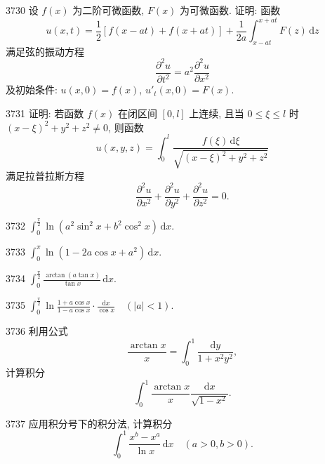 \begin{prob}[M]{3730}
设 $f(x)$ 为二阶可微函数, $F(x)$ 为可微函数. 证明: 函数
\[
u(x, t) = \frac{1}{2} [f(x - at) + f(x + at)] + \frac{1}{2a} \int_{x-at}^{x+at} F(z) \,\mathrm{d}z
\]
满足弦的振动方程
\[
\frac{\partial^2 u}{\partial t^2} = a^2 \frac{\partial^2 u}{\partial x^2}
\]
及初始条件: $u(x, 0) = f(x)$, $u'_t(x, 0) = F(x)$.
\end{prob}

\begin{prob}[M]{3731}
证明: 若函数 $f(x)$ 在闭区间 $[0, l]$ 上连续, 且当 $0 \leqslant \xi \leqslant l$ 时 $(x - \xi)^2 + y^2 + z^2 \neq 0$, 则函数
\[
u(x, y, z) = \int_0^l \frac{f(\xi) \,\mathrm{d}\xi}{\sqrt{(x - \xi)^2 + y^2 + z^2}}
\]
满足拉普拉斯方程
\[
\frac{\partial^2 u}{\partial x^2} + \frac{\partial^2 u}{\partial y^2} + \frac{\partial^2 u}{\partial z^2} = 0.
\]
\end{prob}


\begin{prob}[M]{3732}
$\displaystyle \int_0^{\frac{\pi}{2}} \ln(a^2 \sin^2 x + b^2 \cos^2 x) \,\mathrm{d}x$.
\end{prob}

\begin{prob}[M]{3733}
$\displaystyle \int_0^\pi \ln(1 - 2a \cos x + a^2) \,\mathrm{d}x$.
\end{prob}

\begin{prob}[M]{3734}
$\displaystyle \int_0^{\frac{\pi}{2}} \frac{\arctan(a \tan x)}{\tan x} \,\mathrm{d}x$.
\end{prob}

\begin{prob}[M]{3735}
$\displaystyle \int_0^{\frac{\pi}{2}} \ln \frac{1 + a \cos x}{1 - a \cos x} \cdot \frac{\mathrm{d}x}{\cos x} \quad (|a| < 1)$.
\end{prob}

\begin{prob}[M]{3736}
利用公式
\[
\frac{\arctan x}{x} = \int_0^1 \frac{\mathrm{d}y}{1 + x^2 y^2},
\]
计算积分
\[
\int_0^1 \frac{\arctan x}{x} \frac{\mathrm{d}x}{\sqrt{1 - x^2}}.
\]
\end{prob}

\begin{prob}[M]{3737}
应用积分号下的积分法, 计算积分
\[
\int_0^1 \frac{x^b - x^a}{\ln x} \,\mathrm{d}x \quad (a > 0, b > 0).
\]
\end{prob}

